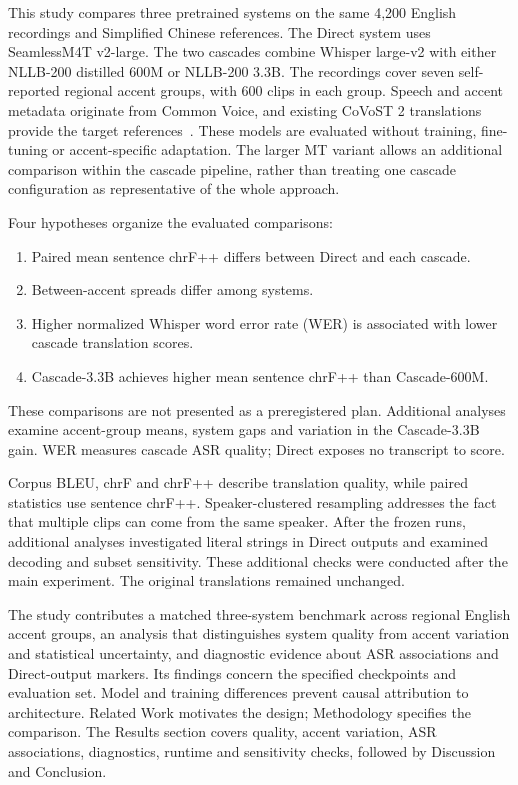 This study compares three pretrained systems on the same 4,200 English recordings and
Simplified Chinese references. The Direct system uses SeamlessM4T v2-large.
The two cascades combine Whisper large-v2 with either NLLB-200 distilled 600M
or NLLB-200 3.3B. The recordings cover seven self-reported regional accent
groups, with 600 clips in each group. Speech and accent metadata originate from
Common Voice, and existing CoVoST 2 translations provide the target
references~\cite{ardila2020commonvoice,wang2021covost2}. These models are evaluated
without training, fine-tuning or accent-specific adaptation. The larger MT
variant allows an additional comparison within the cascade pipeline, rather
than treating one cascade configuration as representative of the whole approach.

Four hypotheses organize the evaluated comparisons:
\begin{enumerate}
\renewcommand{\theenumi}{H\arabic{enumi}}
\renewcommand{\labelenumi}{\theenumi:}
\item\label{hyp:quality} Paired mean sentence chrF++ differs between
Direct and each cascade.
\item\label{hyp:spread} Between-accent spreads differ among systems.
\item\label{hyp:wer} Higher normalized Whisper word error rate (WER) is
associated with lower cascade translation scores.
\item\label{hyp:mt-size} Cascade-3.3B achieves higher mean sentence chrF++
than Cascade-600M.
\end{enumerate}
These comparisons are not presented as a preregistered plan. Additional
analyses examine accent-group means, system gaps and variation in the
Cascade-3.3B gain. WER measures cascade ASR quality; Direct exposes no
transcript to score.

Corpus BLEU, chrF and chrF++ describe translation quality, while paired
statistics use sentence chrF++. Speaker-clustered resampling addresses the fact
that multiple clips can come from the same speaker. After the frozen runs,
additional analyses investigated literal \unk{} strings in Direct outputs and
examined decoding and subset sensitivity. These additional checks were conducted
after the main experiment. The original translations remained unchanged.

The study contributes a matched three-system benchmark across regional English
accent groups, an analysis that distinguishes system quality from accent
variation and statistical uncertainty, and diagnostic evidence about ASR
associations and Direct-output markers. Its findings concern the specified
checkpoints and evaluation set. Model and training differences prevent causal
attribution to architecture. Related Work motivates the design; Methodology
specifies the comparison. The Results section covers quality, accent variation, ASR
associations, diagnostics, runtime and sensitivity checks, followed by
Discussion and Conclusion.
